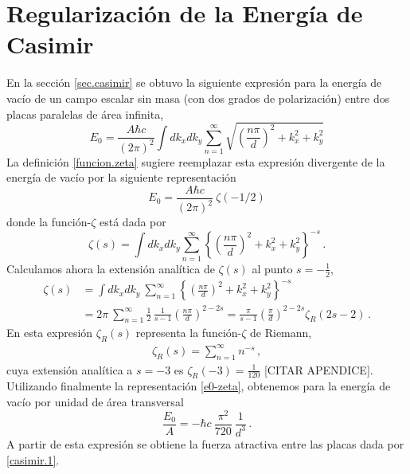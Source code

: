 \section{Regularización de la Energía de Casimir}\label{cap.casimir}

En la sección \ref{sec.casimir} se obtuvo la siguiente expresión para la energía de vacío de un campo escalar sin masa (con dos grados de polarización) entre dos placas paralelas de área infinita,
\begin{equation}
E _0 = \frac{A \hbar c}{(2 \pi) ^2} \int dk _x dk _y 
\sum _{n=1} ^{\infty} 
\sqrt{
		\left( \frac{n \pi}{d} \right) ^2 + k _x ^2 + k _y ^2
		}
\end{equation}
La definición \eqref{funcion.zeta} sugiere reemplazar esta expresión divergente de la energía de vacío por la siguiente representación
\begin{equation}\label{e0-zeta}
E _0 = \frac{A \hbar c}{(2 \pi) ^2} 
\ \zeta ( -1/2 )
\end{equation}
donde la función-$\zeta$ está dada por
\begin{equation}
\zeta(s) = \int dk _x dk _y 
\sum _{n=1} ^{\infty} 
\left\{\left( \frac{n \pi}{d} \right) ^2 + k _x ^2 + k _y ^2\right\}^{-s}\,.
\end{equation}
Calculamos ahora la extensión analítica de $\zeta(s)$ al punto $s=-\frac12$,
\begin{align}
\zeta (s) &= 
\int dk _x dk _y 
\ \sum _{n=1} ^{\infty} 
\left\{	\left( \frac{n \pi}{d} \right) ^2 + k _x ^2 + k _y ^2
		\right\}^{-s} \nonumber\\[2mm]
&=2\pi\ \sum _{n=1} ^{\infty}  \frac12\,\frac{1}{s-1} \left( \frac{n \pi}{d} \right) ^{2-2s} =
\frac{\pi}{s-1} \left( \frac{\pi}{d} \right) ^{2-2s} \zeta_R (2s-2)\,.
\end{align}
En esta expresión $\zeta_R(s)$ representa la función-$\zeta$ de Riemann,
\begin{align}\label{rieman-zeta-def}
	\zeta_R(s)=\sum_{n=1}^\infty n^{-s}\,,
\end{align}
cuya extensión analítica a $s=-3$ es $\zeta_R(-3)=\frac{1}{120}$ [CITAR APENDICE]. Utilizando finalmente la representación \eqref{e0-zeta}, obtenemos para la energía de vacío por unidad de área transversal
\begin{equation}
\frac{E _0}{A} = 
- \hbar c\ \frac{ \pi ^2}{720}\ \frac{1}{d^3}\,.
\end{equation}
A partir de esta expresión se obtiene la fuerza atractiva entre las placas dada por \eqref{casimir.1}.


